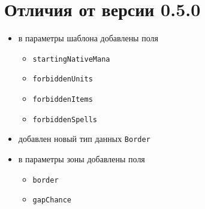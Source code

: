 \section{Отличия от версии 0.5.0}
\begin{itemize}
\item в параметры шаблона добавлены поля
\begin{itemize}
\item \texttt{startingNativeMana}
\item \texttt{forbiddenUnits}
\item \texttt{forbiddenItems}
\item \texttt{forbiddenSpells}
\end{itemize}
\item добавлен новый тип данных \texttt{Border}
\item в параметры зоны добавлены поля
\begin{itemize}
\item \texttt{border}
\item \texttt{gapChance}
\end{itemize}
\end{itemize}